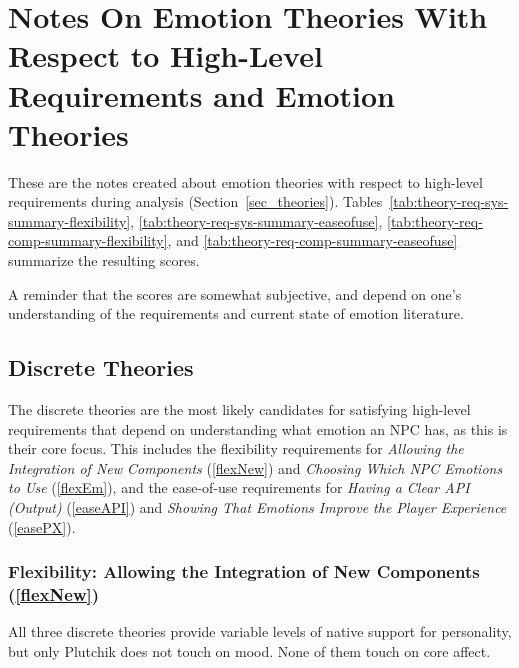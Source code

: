 \section{Notes On Emotion Theories With Respect to High-Level Requirements and
Emotion Theories}\label{chapter:reqsTheoryNotes}

These are the notes created about emotion theories with respect to high-level
requirements during analysis (Section~\ref{sec_theories}).
Tables~\ref{tab:theory-req-sys-summary-flexibility},
\ref{tab:theory-req-sys-summary-easeofuse},
\ref{tab:theory-req-comp-summary-flexibility}, and
\ref{tab:theory-req-comp-summary-easeofuse} summarize the resulting scores.

A reminder that the scores are somewhat subjective, and depend on one's
understanding of the requirements and current state of emotion literature.

\subsection{Discrete Theories}
The discrete theories are the most likely candidates for satisfying high-level
requirements that depend on understanding what emotion an NPC has, as this is
their core focus. This includes the flexibility requirements for
\textit{Allowing the Integration of New Components} (\ref{flexNew}) and
\textit{Choosing Which NPC Emotions to Use} (\ref{flexEm}), and the ease-of-use
requirements for \textit{Having a Clear API (Output)} (\ref{easeAPI}) and
\textit{Showing That Emotions Improve the Player Experience} (\ref{easePX}).

\subsubsection{Flexibility: Allowing the Integration of New Components
    (\ref{flexNew})}
All three discrete theories provide variable levels of native support for
personality, but only Plutchik does not touch on mood. None of them touch on
core affect.

